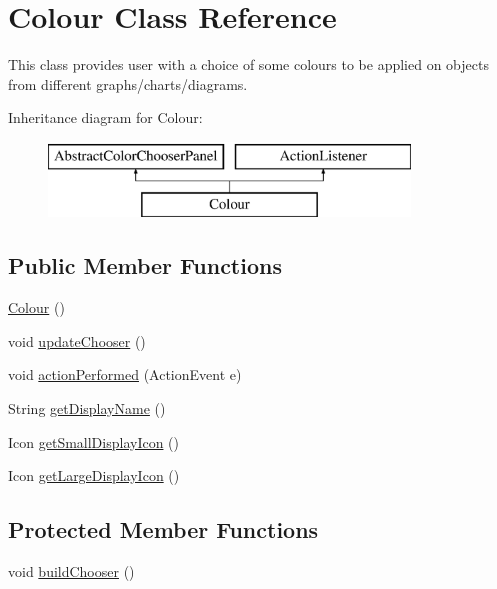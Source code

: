 \hypertarget{class_colour}{\section{Colour Class Reference}
\label{class_colour}
}


This class provides user with a choice of some colours to be applied on objects from different graphs/charts/diagrams.  


Inheritance diagram for Colour\-:\begin{figure}[H]
\begin{center}
\leavevmode
\includegraphics[height=2.000000cm]{class_colour}
\end{center}
\end{figure}
\subsection*{Public Member Functions}
\begin{DoxyCompactItemize}
\item 
\hyperlink{class_colour_a1f07651942561c6818bb26268a39609b}{Colour} ()
\item 
void \hyperlink{class_colour_abc6cd2a5aad847b118f72892e6b39d5a}{update\-Chooser} ()
\item 
void \hyperlink{class_colour_af61690b6ec8f119d9a5f8fc929300b77}{action\-Performed} (Action\-Event e)
\item 
String \hyperlink{class_colour_a1f719e93335cc06a8f5c24fbd50d85a4}{get\-Display\-Name} ()
\item 
Icon \hyperlink{class_colour_afdc3b34af634f3aa1b88bc080c326787}{get\-Small\-Display\-Icon} ()
\item 
Icon \hyperlink{class_colour_a55831e12aaf4110b926ea0240a4fa96f}{get\-Large\-Display\-Icon} ()
\end{DoxyCompactItemize}
\subsection*{Protected Member Functions}
\begin{DoxyCompactItemize}
\item 
void \hyperlink{class_colour_ade22fa4720bb0fc4d477d21fa4785b8c}{build\-Chooser} ()
\end{DoxyCompactItemize}


